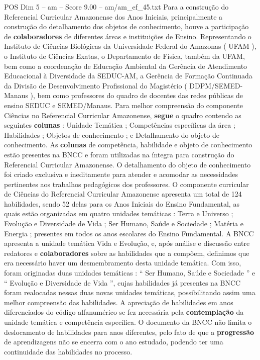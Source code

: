 \begin{textsample}{POS Dim 5 – am – Score 9.00 – am/am\_ef\_45.txt}
Para a construção do Referencial Curricular Amazonense dos Anos Iniciais, principalmente a construção do detalhamento dos objetos de conhecimento, houve a participação de \textbf{colaboradores} de diferentes áreas e instituições de Ensino.
Representando o Instituto de Ciências Biológicas da Universidade Federal do Amazonas ( UFAM ), o Instituto de Ciências Exatas, o Departamento de Física, também da UFAM, bem como a coordenação de Educação Ambiental da Gerência de Atendimento Educacional à Diversidade da SEDUC-AM, a Gerência de Formação Continuada da Divisão de Desenvolvimento Profissional do Magistério ( DDPM/SEMED-Manaus ), bem como professores do quadro de docentes das redes públicas de ensino SEDUC e SEMED/Manaus.
Para melhor compreensão do componente Ciências no Referencial Curricular Amazonense, \textbf{segue} o quadro contendo as seguintes \textbf{colunas} : Unidade Temática ; Competências específicas da área ; Habilidades ; Objetos de conhecimento ; e Detalhamento do objeto de conhecimento.
As \textbf{colunas} de competência, habilidade e objeto de conhecimento estão presentes na BNCC e foram utilizadas na íntegra para construção do Referencial Curricular Amazonense.
O detalhamento do objeto de conhecimento foi criado exclusiva e ineditamente para atender e acomodar as necessidades pertinentes aos trabalhos pedagógicos dos professores.
O componente curricular de Ciências do Referencial Curricular Amazonense apresenta um total de 124 habilidades, sendo 52 delas para os Anos Iniciais do Ensino Fundamental, as quais estão organizadas em quatro unidades temáticas : Terra e Universo ; Evolução e Diversidade de Vida ; Ser Humano, Saúde e Sociedade ; Matéria e Energia ; presentes em todos os anos escolares do Ensino Fundamental.
A BNCC apresenta a unidade temática Vida e Evolução, e, após análise e discussão entre redatores e \textbf{colaboradores} sobre as habilidades que a compõem, definimos que era necessário haver um desmembramento desta unidade temática.
Com isso, foram originadas duas unidades temáticas : “ Ser Humano, Saúde e Sociedade ” e “ Evolução e Diversidade de Vida ”, cujas habilidades já presentes na BNCC foram realocadas nessas duas novas unidades temáticas, possibilitando assim uma melhor compreensão das habilidades.
A apreciação de habilidades em anos diferenciados do código alfanumérico se fez necessária pela \textbf{contemplação} da unidade temática e competência específica.
O documento da BNCC não limita o deslocamento de habilidades para anos diferentes, pelo fato de que a \textbf{progressão} de aprendizagens não se encerra com o ano estudado, podendo ter uma continuidade das habilidades no processo.

\end{textsample}
